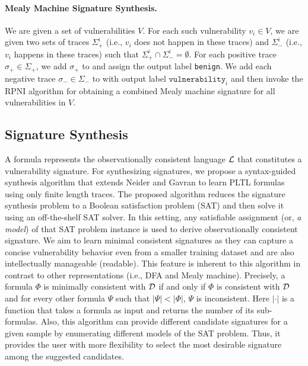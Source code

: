\paragraph{Mealy Machine Signature Synthesis.} We are given a
set of vulnerabilities $V.$ For each such vulnerability $v_i\in V$,
we are given two sets of traces $\Sigma^i_+$ (i.e., $v_i$ does not happen in these traces)
and $\Sigma^i_{-}$ (i.e., $v_i$ happens in these traces) such that
$\Sigma^i_+ \cap \Sigma^i_{-} = \emptyset$. For each positive trace $\sigma_+\in\Sigma_+$,
we add $\sigma_+$ to  and assign the output label \texttt{benign}.
We add each negative trace $\sigma_{-}\in\Sigma_{-}$ to  with output label
$\mathrm{\texttt{vulnerability}}_i$ and then invoke the RPNI algorithm for obtaining a combined
Mealy machine signature for all vulnerabilities in $V.$
%



\subsection{\pltl Signature Synthesis}
\label{sec:pltl_synthesis}
A \pltl formula represents the observationally consistent language $\mathcal{L}$ that constitutes a vulnerability signature.
For synthesizing \pltl signatures, we propose a syntax-guided synthesis algorithm that extends Neider and Gavran \cite{learning_ltl} to
learn PLTL formulas using only finite length traces.
%
The proposed algorithm reduces the signature synthesis problem to a Boolean satisfaction problem (SAT) and
then solve it using an off-the-shelf SAT solver. In this setting, any satisfiable assignment (or, \emph{a model}) of that SAT
problem instance is used to derive observationally consistent \pltl signature.
We aim to learn minimal consistent signatures as
they can  capture a concise
vulnerability behavior
even from a smaller training dataset and are also intellectually
manageable (readable).
%
This feature is inherent to this algorithm in contrast to other representations (i.e., DFA and
Mealy machine).
Precisely, a formula $\Phi$ is minimally consistent with $\mathcal{D}$ if and only if $\Phi$ is consistent
with $\mathcal{D}$ and for every other \pltl formula $\Psi$ such that $|\Psi|<|\Phi|$, $\Psi$  is
inconsistent. Here $|\cdot|$ is a function that takes
a \pltl formula as input and returns the number of its sub-formulas.
%
Also, this algorithm can provide different candidate signatures for a given sample 
by enumerating different models of the SAT problem. Thus, it provides the user with more
flexibility to select the most desirable signature among the suggested candidates.

